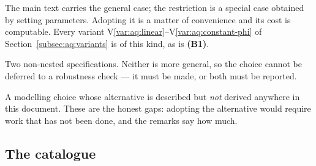 \begin{description}[leftmargin=0em,itemsep=0.3em]
\item[\textnormal{\textbf{Restriction.}}] The main text carries the general case; the restriction is a special case obtained by setting parameters. Adopting it is a matter of convenience and its cost is computable. Every variant V\ref{var:aq:linear}--V\ref{var:aq:constant-phi} of Section~\ref{subsec:aq:variants} is of this kind, as is \textbf{(B1)}.
\item[\textnormal{\textbf{Fork.}}] Two non-nested specifications. Neither is more general, so the choice cannot be deferred to a robustness check --- it must be made, or both must be reported.
\item[\textnormal{\textbf{Maintained assumption.}}] A modelling choice whose alternative is described but \emph{not} derived anywhere in this document. These are the honest gaps: adopting the alternative would require work that has not been done, and the remarks say how much.
\end{description}

\subsection{The catalogue}
\label{subsec:baseline:catalogue}

